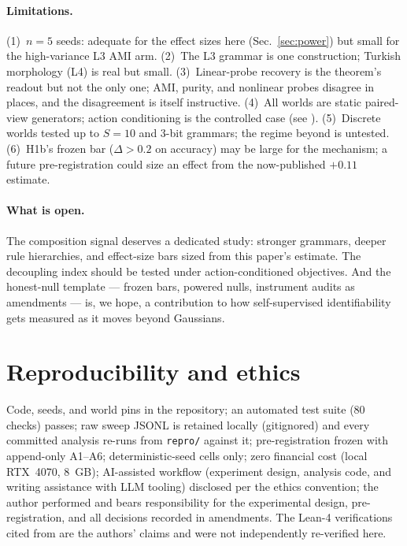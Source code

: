 \documentclass[10pt]{article}
\begin{document}
\paragraph{Limitations.}
(1)~$n{=}5$ seeds: adequate for the effect sizes here (Sec.~\ref{sec:power})
but small for the high-variance L3 AMI arm. (2)~The L3 grammar is one
construction; Turkish morphology (L4) is real but small. (3)~Linear-probe
recovery is the theorem's readout but not the only one; AMI, purity, and
nonlinear probes disagree in places, and the disagreement is itself
instructive. (4)~All worlds are static paired-view generators; action
conditioning is the controlled case (see \citet{controlledWM2026}).
(5)~Discrete worlds tested up to $S{=}10$ and 3-bit grammars; the regime
beyond is untested. (6)~H1b's frozen bar ($\Delta{>}0.2$ on accuracy) may be
large for the mechanism; a future pre-registration could size an effect from
the now-published $+0.11$ estimate.

\paragraph{What is open.}
The composition signal deserves a dedicated study: stronger grammars, deeper
rule hierarchies, and effect-size bars sized from this paper's estimate.
The decoupling index should be tested under action-conditioned objectives.
And the honest-null template --- frozen bars, powered nulls, instrument
audits as amendments --- is, we hope, a contribution to how self-supervised
identifiability gets measured as it moves beyond Gaussians.

\section*{Reproducibility and ethics}
Code, seeds, and world pins in the repository; an automated test suite
(80 checks) passes;
raw sweep JSONL is retained locally (gitignored) and every committed analysis
re-runs from \texttt{repro/} against it; pre-registration frozen with
append-only A1--A6;
deterministic-seed cells only; zero financial cost (local RTX~4070, 8~GB);
AI-assisted workflow (experiment design, analysis code, and writing assistance
with LLM tooling) disclosed per the ethics convention; the author performed
and bears responsibility for the experimental design, pre-registration, and
all decisions recorded in amendments. The Lean-4 verifications cited from \citet{klindt2026lejepa} are the
authors' claims and were not independently re-verified here.
\end{document}

